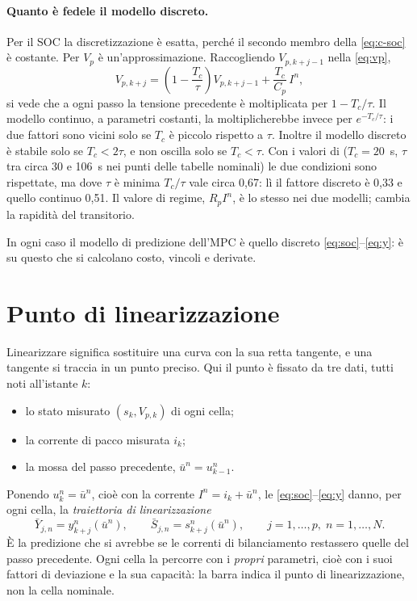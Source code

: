 \documentclass[11pt,a4paper]{article}
\newcommand{\file}[1]{\texttt{\detokenize{#1}}}
\newcommand{\Tc}{T_c}
\begin{document}
\paragraph{Quanto è fedele il modello discreto.} Per il SOC la
discretizzazione è esatta, perché il secondo membro della \eqref{eq:c-soc} è
costante. Per $V_p$ è un'approssimazione. Raccogliendo $V_{p,k+j-1}$ nella
\eqref{eq:vp},
\[
  V_{p,k+j} = \left(1 - \frac{\Tc}{\tau}\right) V_{p,k+j-1}
              + \frac{\Tc}{C_p}\, I^n ,
\]
si vede che a ogni passo la tensione precedente è moltiplicata per
$1 - \Tc/\tau$. Il modello continuo, a parametri costanti, la moltiplicherebbe
invece per $e^{-\Tc/\tau}$: i due fattori sono vicini solo se $\Tc$ è piccolo
rispetto a $\tau$. Inoltre il modello discreto è stabile solo se
$\Tc < 2\tau$, e non oscilla solo se $\Tc < \tau$. Con i valori di
\file{init_parametri.m} ($\Tc = 20$~s, $\tau$ tra circa 30 e 106~s nei punti
delle tabelle nominali) le due condizioni sono rispettate, ma dove $\tau$ è
minima $\Tc/\tau$ vale circa 0,67: lì il fattore discreto è 0,33 e quello
continuo 0,51. Il valore di regime, $R_p I^n$, è lo stesso nei due modelli;
cambia la rapidità del transitorio.

In ogni caso il modello di predizione dell'MPC è quello discreto
\eqref{eq:soc}--\eqref{eq:y}: è su questo che si calcolano costo, vincoli e
derivate.

\section{Punto di linearizzazione}\label{sec:punto}

Linearizzare significa sostituire una curva con la sua retta tangente, e una
tangente si traccia in un punto preciso. Qui il punto è fissato da tre dati,
tutti noti all'istante $k$:
\begin{itemize}
  \item lo stato misurato $(s_k, V_{p,k})$ di ogni cella;
  \item la corrente di pacco misurata $i_k$;
  \item la mossa del passo precedente, $\bar u^n = u^n_{k-1}$.
\end{itemize}
Ponendo $u^n_k = \bar u^n$, cioè con la corrente $I^n = i_k + \bar u^n$, le
\eqref{eq:soc}--\eqref{eq:y} danno, per ogni cella, la \emph{traiettoria di
linearizzazione}
\[
  \bar Y_{j,n} = y^n_{k+j}(\bar u^n), \qquad
  \bar S_{j,n} = s^n_{k+j}(\bar u^n), \qquad j=1,\dots,p,\; n=1,\dots,N .
\]
È la predizione che si avrebbe se le correnti di bilanciamento restassero
quelle del passo precedente. Ogni cella la percorre con i \emph{propri}
parametri, cioè con i suoi fattori di deviazione e la sua capacità: la barra
indica il punto di linearizzazione, non la cella nominale.
\end{document}
